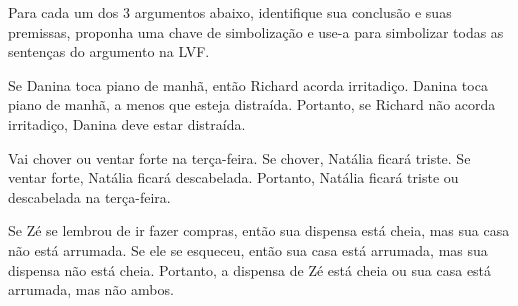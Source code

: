 \problempart
Para cada um dos 3 argumentos abaixo, identifique sua conclusão e suas premissas, proponha uma chave de simbolização e use-a para simbolizar todas as sentenças do argumento na LVF.
\begin{earg}
	\item Se Danina toca piano de manhã, então Richard acorda irritadiço. Danina toca piano de manhã, a menos que esteja distraída. Portanto, se Richard não acorda irritadiço, Danina deve estar distraída.
	\item Vai chover ou ventar forte na terça-feira. Se chover, Natália ficará triste. Se ventar forte, Natália ficará descabelada. Portanto, Natália ficará triste ou descabelada na terça-feira.
	\item Se Zé se lembrou de ir fazer compras, então sua dispensa está cheia, mas sua casa não está arrumada. Se ele se esqueceu, então sua casa está arrumada, mas sua dispensa não está cheia. Portanto, a dispensa de Zé está cheia ou sua casa está arrumada, mas não ambos.
\end{earg}

